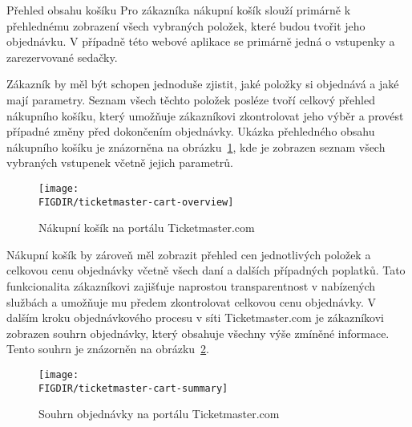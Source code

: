 \begin{subsection}{Přehled obsahu košíku}
    \label{subsec:identifikace-nakupni-kosik-prehled}
    Pro zákazníka nákupní košík slouží primárně k přehlednému zobrazení všech vybraných položek, které budou tvořit jeho objednávku.
    V případně této webové aplikace se primárně jedná o vstupenky a zarezervované sedačky.

    Zákazník by měl být schopen jednoduše zjistit, jaké položky si objednává a jaké mají parametry.
    Seznam všech těchto položek posléze tvoří celkový přehled nákupního košíku, který umožňuje zákazníkovi zkontrolovat jeho výběr a provést případné změny před dokončením objednávky.
    Ukázka přehledného obsahu nákupního košíku je znázorněna na obrázku~\ref{fig:ticketmaster-cart-overview}, kde je zobrazen seznam všech vybraných vstupenek včetně jejich parametrů.

    \begin{figure}[H]
        \texttt{[image: \\FIGDIR/ticketmaster-cart-overview]}
        \centering
        \caption{Nákupní košík na portálu Ticketmaster.com\cite{t__www_ticketmaster_com}}
        \label{fig:ticketmaster-cart-overview}
    \end{figure}

    Nákupní košík by zároveň měl zobrazit přehled cen jednotlivých položek a celkovou cenu objednávky včetně všech daní a dalších případných poplatků.
    Tato funkcionalita zákazníkovi zajišťuje naprostou transparentnost v nabízených službách a umožňuje mu předem zkontrolovat celkovou cenu objednávky.
    V dalším kroku objednávkového procesu v síti Ticketmaster.com je zákazníkovi zobrazen souhrn objednávky, který obsahuje všechny výše zmíněné informace.
    Tento souhrn je znázorněn na obrázku~\ref{fig:ticketmaster-cart-summary}.

    \begin{figure}[H]
        \texttt{[image: \\FIGDIR/ticketmaster-cart-summary]}
        \centering
        \caption{Souhrn objednávky na portálu Ticketmaster.com\cite{t__www_ticketmaster_com}}
        \label{fig:ticketmaster-cart-summary}
    \end{figure}
\end{subsection}


